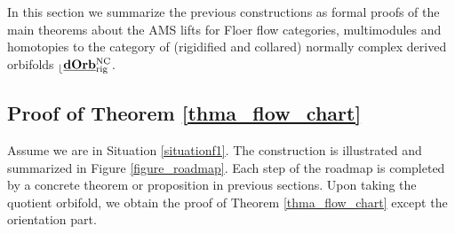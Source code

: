 \documentclass[reqno, 10pt]{amsart}
\numberwithin{equation}{section}
\numberwithin{equation}{section}
\theoremstyle{definition}
\theoremstyle{remark}
\renewcommand{\outer}{{}_{\lfloor}}
\newcommand{\uds}[1]{\underline{\smash{#1}}}
\begin{document}
In this section we summarize the previous constructions as formal proofs of the main theorems about the AMS lifts for Floer flow categories, multimodules and homotopies to the category of (rigidified and collared) normally complex derived orbifolds $\outer\uds{\bf dOrb}_{\rm rig}^{\rm NC}$.


\subsection{Proof of Theorem \ref{thma_flow_chart}}

Assume we are in Situation \ref{situationf1}. The construction is illustrated and summarized in Figure \ref{figure_roadmap}. Each step of the roadmap is completed by a concrete theorem or proposition in previous sections. Upon taking the quotient orbifold, we obtain the proof of Theorem \ref{thma_flow_chart} except the orientation part. 
\end{document}

